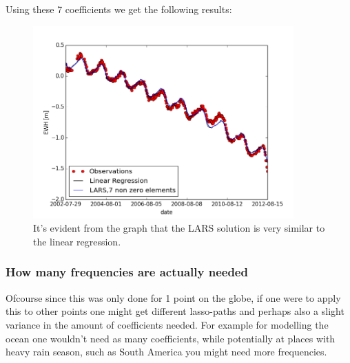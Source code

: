 Using these 7 coefficients we get the following results:
\begin{figure}[H]
\center
\includegraphics[width=10cm]{figures/lars_7.png}
\caption{It's evident from the graph that the LARS solution is very similar to the linear regression.}
\end{figure}

\subsubsection{How many frequencies are actually needed}

Ofcourse since this was only done for 1 point on the globe, if one were to apply this to other points one might get different lasso-paths and perhaps also a slight variance in the amount of coefficients needed. For example for modelling the ocean one wouldn't need as many coefficients, while potentially at places with heavy rain season, such as South America you might need more frequencies.
